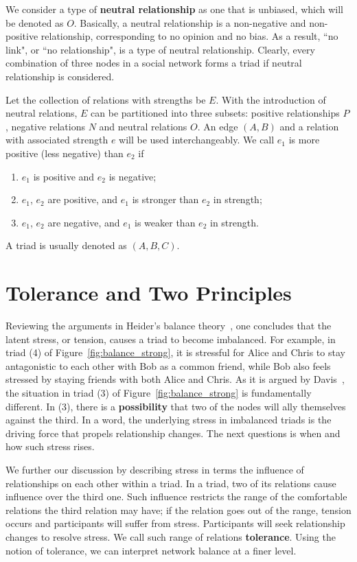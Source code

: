 We consider a type of {\bf neutral relationship} as one that is unbiased, which will be denoted as $O$. Basically, a neutral relationship is a non-negative and non-positive relationship, corresponding to no opinion and no bias. As a result, ``no link", or ``no relationship", is a type of neutral relationship. Clearly, every combination of three nodes in a social network forms a triad if neutral relationship is considered. 

Let the collection of relations with strengths be $E$. With the introduction of neutral
relations, $E$ can be partitioned into three subsets: positive
relationships $P$, negative relations $N$ and neutral relations
$O$.  An edge $(A,B)$ and a relation with associated strength $e$ will be used interchangeably. We call $e_{1}$ is more positive (less negative) than $e_{2}$ if
\begin{enumerate}
\item $e_1$ is positive and $e_{2}$ is negative;
\item $e_{1}$, $e_{2}$ are positive, and $e_{1}$ is stronger than $e_{2}$ in strength;
\item $e_{1}$, $e_{2}$ are negative, and $e_{1}$ is weaker than $e_{2}$ in strength.
\end{enumerate}
A triad is usually denoted as $(A,B,C)$.

\section{Tolerance and Two Principles}
Reviewing the arguments in Heider's balance theory~\cite{Heider:46}, one concludes that the latent stress, or tension, causes a triad to become imbalanced. For example, in triad (4) of Figure~\ref{fig:balance_strong}, it is stressful for Alice and Chris to stay antagonistic to each other with Bob as a common friend, while Bob also feels stressed by staying friends with both Alice and Chris.  As it is argued by Davis~\cite{Davis:67}, the situation in triad (3) of Figure~\ref{fig:balance_strong} is fundamentally different. In (3), there is a {\bf possibility} that two of the nodes will ally themselves against the third. In a word, the underlying stress in imbalanced triads is the driving force that propels relationship changes. The next questions is when and how such stress rises.

We further our discussion by describing stress in terms the influence of relationships on each other within a triad. In a triad, two of its relations cause influence over the third one. Such influence restricts the range of the comfortable relations the third relation may have; if the relation goes out of the range, tension occurs and participants will suffer from stress. Participants
will seek relationship changes to resolve stress. We call
such range of relations {\bf tolerance}. Using the notion of tolerance, we can interpret
network balance at a finer level.

